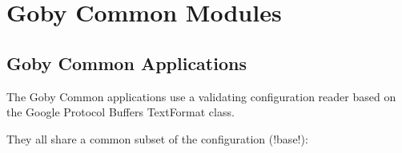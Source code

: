 \chapter{Goby Common Modules}\label{chap:common}
\MakeShortVerb{\!} %

\section{Goby Common Applications}\label{sec:base_cfg}

The Goby Common applications use a validating configuration reader based on the Google Protocol Buffers TextFormat class. 

They all share a common subset of the configuration (!base!):

\resetbvlinenumber

